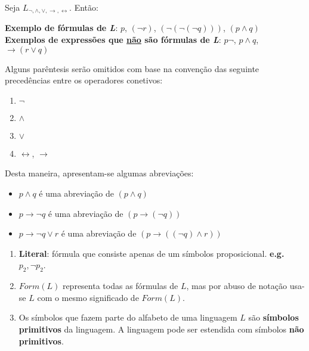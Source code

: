 \begin{example}
    Seja $L_{\neg,\land,\lor,\to,\leftrightarrow}$. Então:
\end{example}

\textbf{Exemplo de fórmulas de \textit{L}}: $p$, $(\neg r)$, $(\neg(\neg(\neg q)))$, $(p\land q)$\\

\textbf{Exemplos de expressões que \underline{não} são fórmulas de \textit{L}}: $p\neg$, $p\land q$, $\to (r \lor q)$\\

\begin{definition}
    Alguns parêntesis serão omitidos com base na convenção das seguinte precedências entre os operadores conetivos:

    \begin{enumerate}
        \item $\neg$
        \item $\land$
        \item $\lor$
        \item $\leftrightarrow$, $\to$
    \end{enumerate}
\end{definition}

Desta maneira, apresentam-se algumas abreviações:

\begin{note}\end{note}
\begin{itemize}
    \item $p \land q$ é uma abreviação de $(p \land q)$
    \item $p \to \neg q$ é uma abreviação de $(p\to(\neg q))$
    \item $p \to \neg q \lor r$ é uma abreviação de $(p\to((\neg q) \land r))$
\end{itemize}

\begin{enumerate}[label=\arabic*.]
    \item \textbf{Literal}: fórmula que consiste apenas de um símbolos proposicional. \textbf{e.g.} $p_2, \neg p_2$.
    \item $Form(L)$ representa todas as fórmulas de $L$, mas por abuso de notação usa-se $L$ com o mesmo significado de $Form(L)$.
    \item Os símbolos que fazem parte do alfabeto de uma linguagem $L$ são \textbf{símbolos primitivos} da linguagem. A linguagem pode ser estendida com símbolos \textbf{não primitivos}.
\end{enumerate}

